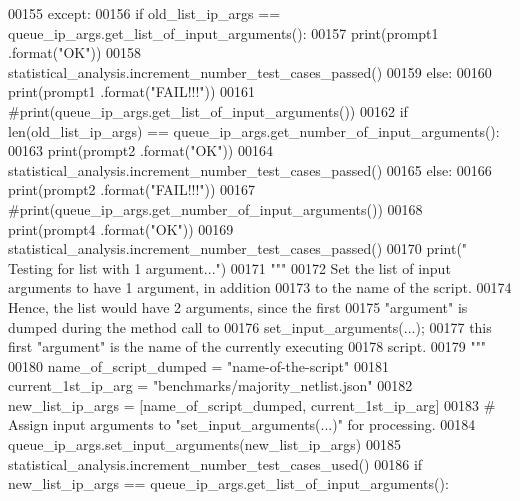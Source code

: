 \begin{DoxyCode}
00155         \textcolor{keywordflow}{except}:
00156             \textcolor{keywordflow}{if} old\_list\_ip\_args == queue\_ip\_args.get\_list\_of\_input\_arguments():
00157                 print(prompt1 .format(\textcolor{stringliteral}{"OK"}))
00158                 statistical\_analysis.increment\_number\_test\_cases\_passed()
00159             \textcolor{keywordflow}{else}:
00160                 print(prompt1 .format(\textcolor{stringliteral}{"FAIL!!!"}))
00161                 \textcolor{comment}{#print(queue\_ip\_args.get\_list\_of\_input\_arguments())}
00162             \textcolor{keywordflow}{if} len(old\_list\_ip\_args) == queue\_ip\_args.get\_number\_of\_input\_arguments():
00163                 print(prompt2 .format(\textcolor{stringliteral}{"OK"}))
00164                 statistical\_analysis.increment\_number\_test\_cases\_passed()
00165             \textcolor{keywordflow}{else}:
00166                 print(prompt2 .format(\textcolor{stringliteral}{"FAIL!!!"}))
00167                 \textcolor{comment}{#print(queue\_ip\_args.get\_number\_of\_input\_arguments())}
00168             print(prompt4 .format(\textcolor{stringliteral}{"OK"}))
00169             statistical\_analysis.increment\_number\_test\_cases\_passed()
00170         print(\textcolor{stringliteral}{" Testing for list with 1 argument..."})
00171         \textcolor{stringliteral}{"""}
00172 \textcolor{stringliteral}{            Set the list of input arguments to have 1 argument, in addition}
00173 \textcolor{stringliteral}{                to the name of the script.}
00174 \textcolor{stringliteral}{            Hence, the list would have 2 arguments, since the first}
00175 \textcolor{stringliteral}{                "argument" is dumped during the method call to}
00176 \textcolor{stringliteral}{                set\_input\_arguments(...);}
00177 \textcolor{stringliteral}{                this first "argument" is the name of the currently executing}
00178 \textcolor{stringliteral}{                    script.}
00179 \textcolor{stringliteral}{        """}
00180         name\_of\_script\_dumped = \textcolor{stringliteral}{"name-of-the-script"}
00181         current\_1st\_ip\_arg = \textcolor{stringliteral}{"benchmarks/majority\_netlist.json"}
00182         new\_list\_ip\_args = [name\_of\_script\_dumped, current\_1st\_ip\_arg]
00183         \textcolor{comment}{#   Assign input arguments to "set\_input\_arguments(...)" for processing.}
00184         queue\_ip\_args.set\_input\_arguments(new\_list\_ip\_args)
00185         statistical\_analysis.increment\_number\_test\_cases\_used()
00186         \textcolor{keywordflow}{if} new\_list\_ip\_args == queue\_ip\_args.get\_list\_of\_input\_arguments():

\end{DoxyCode}
